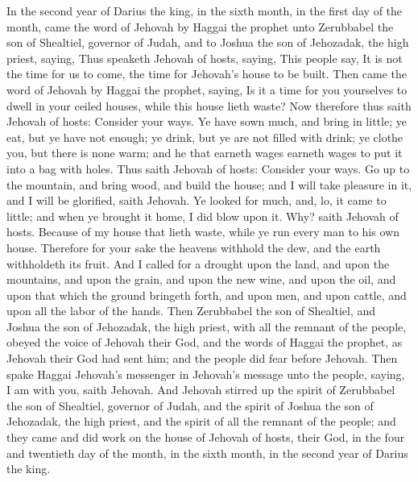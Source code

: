 


In the second year of Darius the king, in the sixth month, in the first day of the month, came the word of Jehovah by Haggai the prophet unto Zerubbabel the son of Shealtiel, governor of Judah, and to Joshua the son of Jehozadak, the high priest, saying, Thus speaketh Jehovah of hosts, saying, This people say, It is not the time for us to come, the time for Jehovah’s house to be built. Then came the word of Jehovah by Haggai the prophet, saying, Is it a time for you yourselves to dwell in your ceiled houses, while this house lieth waste? Now therefore thus saith Jehovah of hosts: Consider your ways. Ye have sown much, and bring in little; ye eat, but ye have not enough; ye drink, but ye are not filled with drink; ye clothe you, but there is none warm; and he that earneth wages earneth wages to put it into a bag with holes.  Thus saith Jehovah of hosts: Consider your ways. Go up to the mountain, and bring wood, and build the house; and I will take pleasure in it, and I will be glorified, saith Jehovah. Ye looked for much, and, lo, it came to little; and when ye brought it home, I did blow upon it. Why? saith Jehovah of hosts. Because of my house that lieth waste, while ye run every man to his own house. Therefore for your sake the heavens withhold the dew, and the earth withholdeth its fruit. And I called for a drought upon the land, and upon the mountains, and upon the grain, and upon the new wine, and upon the oil, and upon that which the ground bringeth forth, and upon men, and upon cattle, and upon all the labor of the hands.  Then Zerubbabel the son of Shealtiel, and Joshua the son of Jehozadak, the high priest, with all the remnant of the people, obeyed the voice of Jehovah their God, and the words of Haggai the prophet, as Jehovah their God had sent him; and the people did fear before Jehovah. Then spake Haggai Jehovah’s messenger in Jehovah’s message unto the people, saying, I am with you, saith Jehovah. And Jehovah stirred up the spirit of Zerubbabel the son of Shealtiel, governor of Judah, and the spirit of Joshua the son of Jehozadak, the high priest, and the spirit of all the remnant of the people; and they came and did work on the house of Jehovah of hosts, their God, in the four and twentieth day of the month, in the sixth month, in the second year of Darius the king. 

